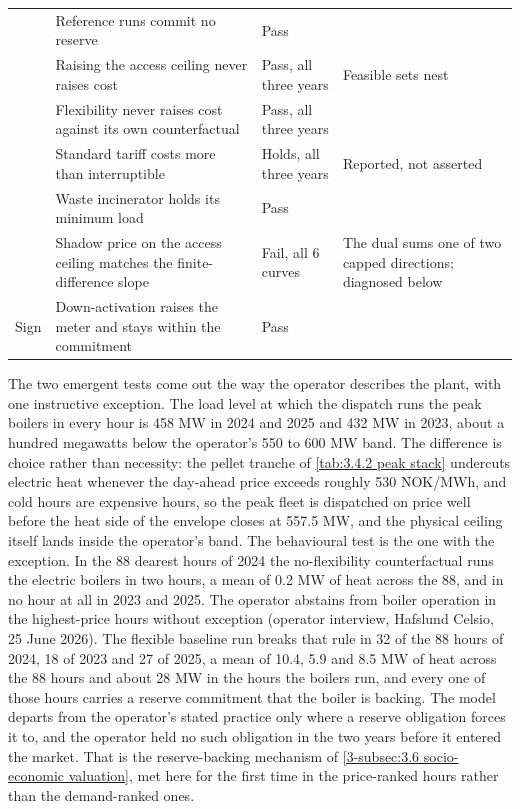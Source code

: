 \begin{table}[htbp]
\begin{tabular}{p{1.9cm} p{5.5cm} p{1.6cm} p{4.6cm}}
 & Reference runs commit no reserve & Pass & \\
 & Raising the access ceiling never raises cost & Pass, all three years & Feasible sets nest \\
 & Flexibility never raises cost against its own counterfactual & Pass, all three years & \\
 & Standard tariff costs more than interruptible & Holds, all three years & Reported, not asserted \\
 & Waste incinerator holds its minimum load & Pass & \\
 & Shadow price on the access ceiling matches the finite-difference slope & Fail, all 6 curves & The dual sums one of two capped directions; diagnosed below \\
\addlinespace
Sign & Down-activation raises the meter and stays within the commitment & Pass & \\
\bottomrule
\end{tabular}
\label{tab:4.1 validation}
\end{table}

The two emergent tests come out the way the operator describes the plant, with one instructive exception. The load level at which the dispatch runs the peak boilers in every hour is 458 MW in 2024 and 2025 and 432 MW in 2023, about a hundred megawatts below the operator's 550 to 600 MW band. The difference is choice rather than necessity: the pellet tranche of \autoref{tab:3.4.2 peak stack} undercuts electric heat whenever the day-ahead price exceeds roughly 530 NOK/MWh, and cold hours are expensive hours, so the peak fleet is dispatched on price well before the heat side of the envelope closes at 557.5 MW, and the physical ceiling itself lands inside the operator's band. The behavioural test is the one with the exception. In the 88 dearest hours of 2024 the no-flexibility counterfactual runs the electric boilers in two hours, a mean of 0.2 MW of heat across the 88, and in no hour at all in 2023 and 2025. The operator abstains from boiler operation in the highest-price hours without exception (operator interview, Hafslund Celsio, 25 June 2026). The flexible baseline run breaks that rule in 32 of the 88 hours of 2024, 18 of 2023 and 27 of 2025, a mean of 10.4, 5.9 and 8.5 MW of heat across the 88 hours and about 28 MW in the hours the boilers run, and every one of those hours carries a reserve commitment that the boiler is backing. The model departs from the operator's stated practice only where a reserve obligation forces it to, and the operator held no such obligation in the two years before it entered the market. That is the reserve-backing mechanism of \autoref{3-subsec:3.6 socio-economic valuation}, met here for the first time in the price-ranked hours rather than the demand-ranked ones.

